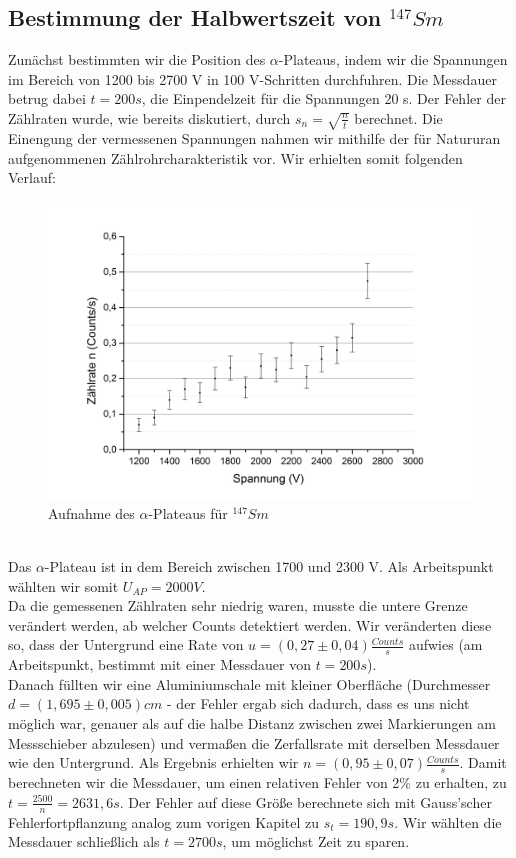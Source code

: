   \subsection{Bestimmung der Halbwertszeit von $^{147}Sm$}
  Zunächst bestimmten wir die Position des $\alpha$-Plateaus, indem wir die Spannungen im Bereich von 1200 bis 2700 V in 100 V-Schritten durchfuhren. Die Messdauer betrug dabei $t=200s$, die Einpendelzeit für die Spannungen 20 s. Der Fehler der Zählraten wurde, wie bereits diskutiert, durch $s_{n}=\sqrt{\frac{n}{t}}$ berechnet. Die Einengung der vermessenen Spannungen nahmen wir mithilfe der für Natururan aufgenommenen Zählrohrcharakteristik vor. Wir erhielten somit folgenden Verlauf:
  \begin{figure}[h]
  \begin{center}
  \includegraphics[scale=0.5]{Bilder/smlin}
  \caption{Aufnahme des $\alpha$-Plateaus für $^{147}Sm$}
  \end{center}
  \end{figure}
  ~\\
  Das $\alpha$-Plateau ist in dem Bereich zwischen 1700 und 2300 V. Als Arbeitspunkt wählten wir somit $U_{AP}=2000 V$.\\
  Da die gemessenen Zählraten sehr niedrig waren, musste die untere Grenze verändert werden, ab welcher Counts detektiert werden. Wir veränderten diese so, dass der Untergrund eine Rate von $u=(0,27\pm0,04)\frac{Counts}{s}$ aufwies (am Arbeitspunkt, bestimmt mit einer Messdauer von $t=200s$). \\
  Danach füllten wir eine Aluminiumschale mit kleiner Oberfläche (Durchmesser $d=(1,695\pm0,005)cm$ - der Fehler ergab sich dadurch, dass es uns nicht möglich war, genauer als auf die halbe Distanz zwischen zwei Markierungen am Messschieber abzulesen) und vermaßen die Zerfallsrate mit derselben Messdauer wie den Untergrund. Als Ergebnis erhielten wir $n=(0,95\pm0,07)\frac{Counts}{s}$. Damit berechneten wir die Messdauer, um einen relativen Fehler von 2\% zu erhalten, zu $t=\frac{2500}{n}=2631,6s$. Der Fehler auf diese Größe berechnete sich mit Gauss'scher Fehlerfortpflanzung analog zum vorigen Kapitel zu $s_{t}=190,9s$. Wir wählten die Messdauer schließlich als $t=2700 s$, um möglichst Zeit zu sparen. \\
